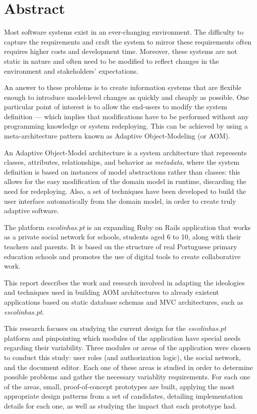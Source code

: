 \chapter*{Abstract}

Most software systems exist in an ever-changing environment. The difficulty to capture the requirements and craft the system to mirror these requirements often requires higher costs and development time. Moreover, these systems are not static in nature and often need to be modified to reflect changes in the environment and stakeholders' expectations.

An answer to these problems is to create information systems that are flexible enough to introduce model-level changes as quickly and cheaply as possible. One particular point of interest is to allow the end-users to modify the system definition --- which implies that modifications have to be performed without any programming knowledge or system redeploying. This can be achieved by using a meta-architecture pattern known as Adaptive Object-Modeling (or AOM).

An Adaptive Object-Model architecture is a system architecture that represents classes, attributes, relationships, and behavior as \emph{metadata}, where the system definition is based on instances of model abstractions rather than classes: this allows for the easy modification of the domain model in runtime, discarding the need for redeploying. Also, a set of techniques have been developed to build the user interface automatically from the domain model, in order to create truly adaptive software.

The platform \emph{escolinhas.pt} is an expanding Ruby on Rails application that works as a private social network for schools, students aged 6 to 10, along with their teachers and parents. It is based on the structure of real Portuguese primary education schools and promotes the use of digital tools to create collaborative work.

This report describes the work and research involved in adapting the ideologies and techniques used in building AOM architectures to already existent applications based on static database schemas and MVC architectures, such as \emph{escolinhas.pt}.

This research focuses on studying the current design for the \emph{escolinhas.pt} platform and pinpointing which modules of the application have special needs regarding their variability. Three modules or areas of the application were chosen to conduct this study: user roles (and authorization logic), the social network, and the document editor. Each one of these areas is studied in order to determine possible problems and gather the necessary variablity requirements. For each one of the areas, small, proof-of-concept prototypes are built, applying the most appropriate design patterns from a set of candidates, detailing implementation details for each one, as well as studying the impact that each prototype had.

